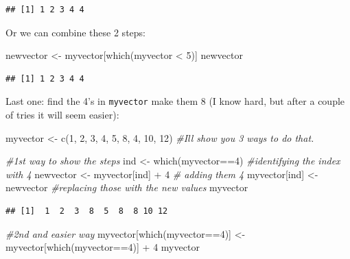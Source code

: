 \documentclass[
]{book}
\newenvironment{Shaded}{\begin{snugshade}}{\end{snugshade}}
\newcommand{\CommentTok}[1]{\textcolor[rgb]{0.56,0.35,0.01}{\textit{#1}}}
\newcommand{\DecValTok}[1]{\textcolor[rgb]{0.00,0.00,0.81}{#1}}
\newcommand{\FunctionTok}[1]{\textcolor[rgb]{0.00,0.00,0.00}{#1}}
\newcommand{\NormalTok}[1]{#1}
\newcommand{\OtherTok}[1]{\textcolor[rgb]{0.56,0.35,0.01}{#1}}
\newcommand{\SpecialCharTok}[1]{\textcolor[rgb]{0.00,0.00,0.00}{#1}}
\theoremstyle{definition}
\theoremstyle{definition}
\theoremstyle{definition}
\theoremstyle{definition}
\theoremstyle{remark}
\begin{document}
\begin{verbatim}
## [1] 1 2 3 4 4
\end{verbatim}

Or we can combine these 2 steps:

\begin{Shaded}
\begin{Highlighting}[]
\NormalTok{newvector }\OtherTok{\textless{}{-}}\NormalTok{ myvector[}\FunctionTok{which}\NormalTok{(myvector }\SpecialCharTok{\textless{}} \DecValTok{5}\NormalTok{)]}
\NormalTok{newvector}
\end{Highlighting}
\end{Shaded}

\begin{verbatim}
## [1] 1 2 3 4 4
\end{verbatim}

Last one: find the 4's in \texttt{myvector} make them 8 (I know hard, but after a couple of tries it will seem easier):

\begin{Shaded}
\begin{Highlighting}[]
\NormalTok{myvector }\OtherTok{\textless{}{-}} \FunctionTok{c}\NormalTok{(}\DecValTok{1}\NormalTok{, }\DecValTok{2}\NormalTok{, }\DecValTok{3}\NormalTok{, }\DecValTok{4}\NormalTok{, }\DecValTok{5}\NormalTok{, }\DecValTok{8}\NormalTok{, }\DecValTok{4}\NormalTok{, }\DecValTok{10}\NormalTok{, }\DecValTok{12}\NormalTok{)}
\CommentTok{\#I\textquotesingle{}ll show you 3 ways to do that.}

\CommentTok{\#1st way to show the steps}
\NormalTok{ind }\OtherTok{\textless{}{-}} \FunctionTok{which}\NormalTok{(myvector}\SpecialCharTok{==}\DecValTok{4}\NormalTok{) }\CommentTok{\#identifying the index with 4}
\NormalTok{newvector }\OtherTok{\textless{}{-}}\NormalTok{ myvector[ind] }\SpecialCharTok{+} \DecValTok{4} \CommentTok{\# adding them 4}
\NormalTok{myvector[ind] }\OtherTok{\textless{}{-}}\NormalTok{ newvector }\CommentTok{\#replacing those with the new values}
\NormalTok{myvector}
\end{Highlighting}
\end{Shaded}

\begin{verbatim}
## [1]  1  2  3  8  5  8  8 10 12
\end{verbatim}

\begin{Shaded}
\begin{Highlighting}[]
\CommentTok{\#2nd and easier way}
\NormalTok{myvector[}\FunctionTok{which}\NormalTok{(myvector}\SpecialCharTok{==}\DecValTok{4}\NormalTok{)] }\OtherTok{\textless{}{-}}\NormalTok{ myvector[}\FunctionTok{which}\NormalTok{(myvector}\SpecialCharTok{==}\DecValTok{4}\NormalTok{)] }\SpecialCharTok{+} \DecValTok{4}
\NormalTok{myvector}
\end{Highlighting}
\end{Shaded}
\end{document}
